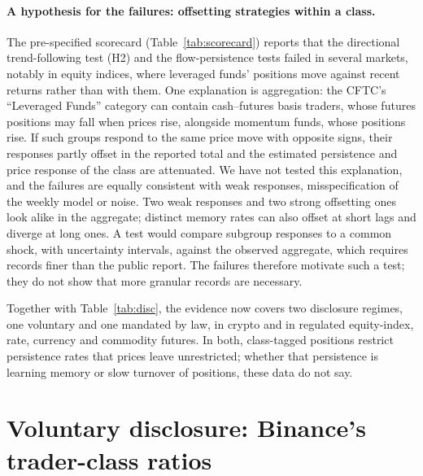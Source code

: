 \documentclass[12pt]{article}
\theoremstyle{definition}
\theoremstyle{remark}
\begin{document}
\paragraph{A hypothesis for the failures: offsetting strategies within a class.} The pre-specified scorecard (Table~\ref{tab:scorecard}) reports that the directional trend-following test (H2) and the flow-persistence tests failed in several markets, notably in equity indices, where leveraged funds' positions move against recent returns rather than with them. One explanation is aggregation: the CFTC's ``Leveraged Funds'' category can contain cash--futures basis traders, whose futures positions may fall when prices rise, alongside momentum funds, whose positions rise. If such groups respond to the same price move with opposite signs, their responses partly offset in the reported total and the estimated persistence and price response of the class are attenuated. We have not tested this explanation, and the failures are equally consistent with weak responses, misspecification of the weekly model or noise. Two weak responses and two strong offsetting ones look alike in the aggregate; distinct memory rates can also offset at short lags and diverge at long ones. A test would compare subgroup responses to a common shock, with uncertainty intervals, against the observed aggregate, which requires records finer than the public report. The failures therefore motivate such a test; they do not show that more granular records are necessary.

Together with Table~\ref{tab:disc}, the evidence now covers two disclosure regimes, one voluntary and one mandated by law, in crypto and in regulated equity-index, rate, currency and commodity futures. In both, class-tagged positions restrict persistence rates that prices leave unrestricted; whether that persistence is learning memory or slow turnover of positions, these data do not say.

\section{Voluntary disclosure: Binance's trader-class ratios}\label{sec:disc_data}
\end{document}
